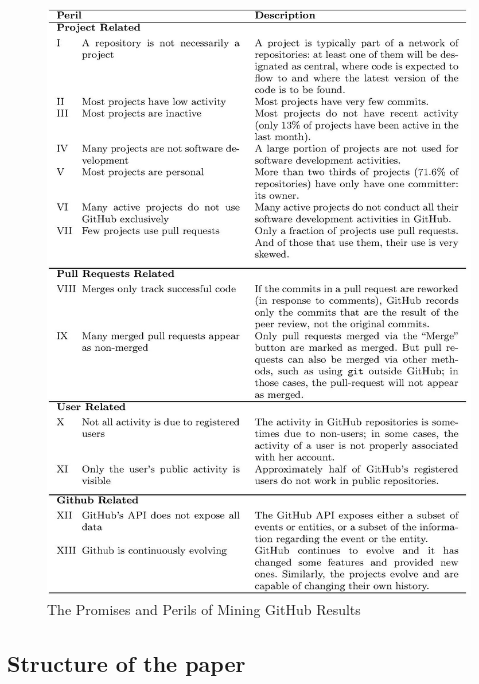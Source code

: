 \begin{figure}
\centering
\includegraphics[scale=1.0]{images/file-page1}
\caption{The Promises and Perils of Mining GitHub Results}
\label{fig:github}
\end{figure}


\subsection{Structure of the paper}